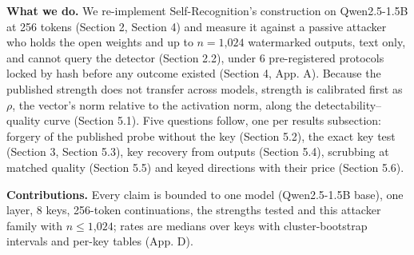 \documentclass[11pt,letterpaper]{article}
\begin{document}
\textbf{What we do.} We re-implement Self-Recognition's construction on Qwen2.5-1.5B at 256 tokens (Section 2, Section 4) and measure it against a passive attacker who holds the open weights and up to \(n = \text{1,024}\) watermarked outputs, text only, and cannot query the detector (Section 2.2), under 6 pre-registered protocols locked by hash before any outcome existed (Section 4, App. A). Because the published strength does not transfer across models, strength is calibrated first as \(\rho\), the vector's norm relative to the activation norm, along the detectability--quality curve (Section 5.1). Five questions follow, one per results subsection: forgery of the published probe without the key (Section 5.2), the exact key test (Section 3, Section 5.3), key recovery from outputs (Section 5.4), scrubbing at matched quality (Section 5.5) and keyed directions with their price (Section 5.6).

\textbf{Contributions.} Every claim is bounded to one model (Qwen2.5-1.5B base), one layer, 8 keys, 256-token continuations, the strengths tested and this attacker family with \(n \leq \text{1,024}\); rates are medians over keys with cluster-bootstrap intervals and per-key tables (App. D).
\end{document}
